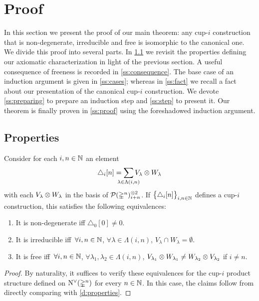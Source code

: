 
\section{Proof} \label{s:proof}

In this section we present the proof of our main theorem: any \mbox{cup-$i$} construction that is non-degenerate, irreducible and free is isomorphic to the canonical one.
We divide this proof into several parts.
In \cref{ss:properties} we revisit the properties defining our axiomatic characterization in light of the previous section.
A useful consequence of freeness is recorded in \cref{ss:consequence}.
The base case of an induction argument is given in \cref{ss:cases}; whereas in
\cref{ss:fact} we recall a fact about our presentation of the canonical cup-$i$ construction.
We devote \cref{ss:preparing} to prepare an induction step and \cref{ss:step} to present it.
Our theorem is finally proven in \cref{ss:proof} using the foreshadowed induction argument.

\subsection{Properties} \label{ss:properties}

\begin{lemma} \label{l:properties}
	Consider for each $i,n \in \mathbb{N}$ an element
	\[
	\triangle_i [n] =
	\sum_{\mathclap{\lambda \in \Lambda(i,n)}} V_\lambda \ot W_\lambda
	\]
	with each $V_\lambda \otimes W_\lambda$ in the basis of $\mathcal{P}(\mathbb{\Delta}^n)^{\otimes 2}_{i+n}$.
	If $\big\{ \triangle_i [n] \big\}_{i,n \in \mathbb{N}}$ defines a \mbox{cup-$i$} construction, this satisfies the following equivalences:
	\begin{enumerate}
		\item It is non-degenerate iff
		$\triangle_0 [0] \neq 0$.
		\item It is irreducible iff\,
		$\forall i,n \in \mathbb{N}$, $\forall \lambda \in \Lambda(i,n)$, $V_\lambda \cap W_\lambda = \emptyset$.
		\item \label{i:free} It is free iff\,
		$\forall i,n \in \mathbb{N}$, $\forall \lambda_1, \lambda_2 \in \Lambda(i,n)$, $V_{\lambda_1} \otimes W_{\lambda_1} \neq W_{\lambda_2} \otimes V_{\lambda_2}$ if $i \neq n$.
	\end{enumerate}
\end{lemma}

\begin{proof}
	By naturality, it suffices to verify these equivalences for the \mbox{cup-$i$} product structure defined on $\operatorname{N^{\vee}}(\mathbb{\Delta}^n)$ for every $n \in \mathbb{N}$.
	In this case, the claims follow from directly comparing with \cref{d:properties}.
\end{proof}

